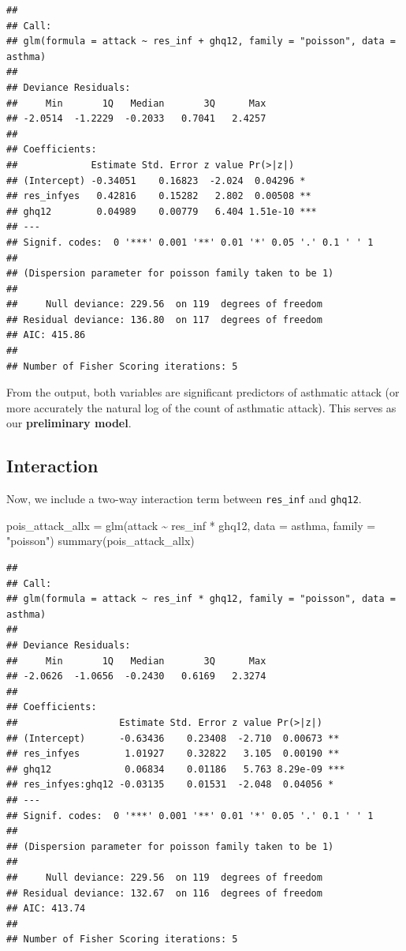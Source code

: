 \documentclass[
  10pt,
]{krantz}
\newenvironment{Shaded}{\begin{snugshade}}{\end{snugshade}}
\newcommand{\AttributeTok}[1]{\textcolor[rgb]{0.77,0.63,0.00}{#1}}
\newcommand{\FunctionTok}[1]{\textcolor[rgb]{0.00,0.00,0.00}{#1}}
\newcommand{\NormalTok}[1]{#1}
\newcommand{\OtherTok}[1]{\textcolor[rgb]{0.56,0.35,0.01}{#1}}
\newcommand{\SpecialCharTok}[1]{\textcolor[rgb]{0.00,0.00,0.00}{#1}}
\newcommand{\StringTok}[1]{\textcolor[rgb]{0.31,0.60,0.02}{#1}}
\begin{document}
\begin{verbatim}
## 
## Call:
## glm(formula = attack ~ res_inf + ghq12, family = "poisson", data = asthma)
## 
## Deviance Residuals: 
##     Min       1Q   Median       3Q      Max  
## -2.0514  -1.2229  -0.2033   0.7041   2.4257  
## 
## Coefficients:
##             Estimate Std. Error z value Pr(>|z|)    
## (Intercept) -0.34051    0.16823  -2.024  0.04296 *  
## res_infyes   0.42816    0.15282   2.802  0.00508 ** 
## ghq12        0.04989    0.00779   6.404 1.51e-10 ***
## ---
## Signif. codes:  0 '***' 0.001 '**' 0.01 '*' 0.05 '.' 0.1 ' ' 1
## 
## (Dispersion parameter for poisson family taken to be 1)
## 
##     Null deviance: 229.56  on 119  degrees of freedom
## Residual deviance: 136.80  on 117  degrees of freedom
## AIC: 415.86
## 
## Number of Fisher Scoring iterations: 5
\end{verbatim}

From the output, both variables are significant predictors of asthmatic attack (or more accurately the natural log of the count of asthmatic attack). This serves as our \textbf{preliminary model}.

\hypertarget{interaction-1}{%
\subsection{\texorpdfstring{Interaction}{Interaction}}\label{interaction-1}}

Now, we include a two-way interaction term between \texttt{res\_inf} and \texttt{ghq12}.

\begin{Shaded}
\begin{Highlighting}[]
\NormalTok{pois\_attack\_allx }\OtherTok{=} \FunctionTok{glm}\NormalTok{(attack }\SpecialCharTok{\textasciitilde{}}\NormalTok{ res\_inf }\SpecialCharTok{*}\NormalTok{ ghq12, }\AttributeTok{data =}\NormalTok{ asthma, }
                       \AttributeTok{family =} \StringTok{"poisson"}\NormalTok{)}
\FunctionTok{summary}\NormalTok{(pois\_attack\_allx)}
\end{Highlighting}
\end{Shaded}

\begin{verbatim}
## 
## Call:
## glm(formula = attack ~ res_inf * ghq12, family = "poisson", data = asthma)
## 
## Deviance Residuals: 
##     Min       1Q   Median       3Q      Max  
## -2.0626  -1.0656  -0.2430   0.6169   2.3274  
## 
## Coefficients:
##                  Estimate Std. Error z value Pr(>|z|)    
## (Intercept)      -0.63436    0.23408  -2.710  0.00673 ** 
## res_infyes        1.01927    0.32822   3.105  0.00190 ** 
## ghq12             0.06834    0.01186   5.763 8.29e-09 ***
## res_infyes:ghq12 -0.03135    0.01531  -2.048  0.04056 *  
## ---
## Signif. codes:  0 '***' 0.001 '**' 0.01 '*' 0.05 '.' 0.1 ' ' 1
## 
## (Dispersion parameter for poisson family taken to be 1)
## 
##     Null deviance: 229.56  on 119  degrees of freedom
## Residual deviance: 132.67  on 116  degrees of freedom
## AIC: 413.74
## 
## Number of Fisher Scoring iterations: 5
\end{verbatim}
\end{document}
